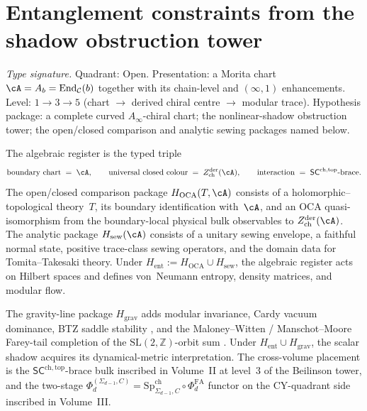 
\section{Entanglement constraints from the shadow obstruction tower}
\label{sec:thqg-entanglement-theory}

\begin{remark}
\label{rem:thqg-ent-algebraic-sector}
\textit{Type signature.}
Quadrant: Open. Presentation: a Morita chart
$\cA=A_b=\operatorname{End}_{\mathcal C}(b)$ together with its
chain-level and $(\infty,1)$ enhancements.  Level:
$1 \to 3 \to 5$ (chart $\to$ derived chiral centre $\to$
modular trace).  Hypothesis package: a complete curved
$A_\infty$-chiral chart; the nonlinear-shadow obstruction tower;
the open/closed comparison and analytic sewing packages named below.
\medskip

The algebraic register is the typed triple
\begin{equation}\label{eq:thqg-ent-algebraic-sector}
\mathrm{boundary\ chart} \;=\; \cA, \qquad
\mathrm{universal\ closed\ colour} \;=\;
 Z^{\mathrm{der}}_{\mathrm{ch}}(\cA), \qquad
\mathrm{interaction} \;=\; \mathsf{SC}^{\mathrm{ch,top}}\text{-brace}.
\end{equation}
The open/closed comparison package $H_{\mathrm{OCA}}(T,\cA)$ consists
of a holomorphic--topological theory~$T$, its boundary identification
with~$\cA$, and an OCA quasi-isomorphism from the boundary-local
physical bulk observables to
$Z^{\mathrm{der}}_{\mathrm{ch}}(\cA)$.  The analytic package
$H_{\mathrm{sew}}(\cA)$ consists of a unitary sewing envelope, a
faithful normal state, positive trace-class sewing operators, and the
domain data for Tomita--Takesaki theory.  Under
$H_{\mathrm{ent}}:=H_{\mathrm{OCA}}\cup H_{\mathrm{sew}}$, the
algebraic register acts on Hilbert spaces and defines von~Neumann
entropy, density matrices, and modular flow.

The gravity-line package $H_{\mathrm{grav}}$ adds modular invariance,
Cardy vacuum dominance, BTZ saddle stability
\cite{BTZ92,Cardy86}, and the Maloney--Witten / Manschot--Moore
Farey-tail completion of the $\mathrm{SL}(2,\mathbb{Z})$-orbit sum
\cite{Maloney-Witten07}.  Under
$H_{\mathrm{ent}}\cup H_{\mathrm{grav}}$, the scalar shadow acquires
its dynamical-metric interpretation.
The cross-volume placement is the
$\mathsf{SC}^{\mathrm{ch,top}}$-brace bulk inscribed in Volume~II at
level~$3$ of the Beilinson tower, and the two-stage
$\Phi_d^{(\Sigma_{d-1}, C)} = \mathrm{Sp}^{\mathrm{ch}}_{\Sigma_{d-1},
C} \circ \Phi_d^{\mathrm{FA}}$ functor on the CY-quadrant side
inscribed in Volume~III.
\end{remark}

